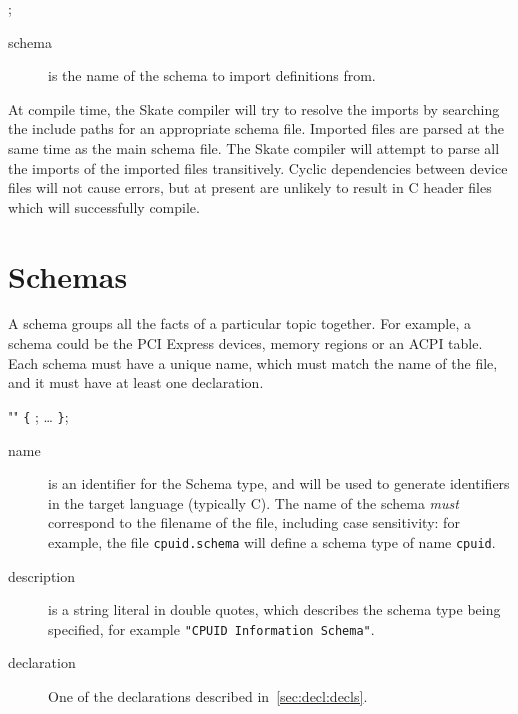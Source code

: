 \documentclass[a4paper,11pt,twoside]{report}
\begin{document}
{{\begin{syntax}
 ;
\end{syntax}

\begin{description}
\item[schema] is the name of the schema to import definitions from.  
\end{description}

At compile time, the Skate compiler will try to resolve the imports by 
searching the include paths for an appropriate schema file. Imported files
are parsed at the same time as the main schema file. The Skate compiler will
attempt to parse all the imports of the imported files transitively. 
Cyclic dependencies between device files will not cause errors, but at present 
are unlikely to result in C header files which will successfully compile. 

\section{Schemas}\label{sec:decl:schema}

A schema groups all the facts of a particular topic together. For example, 
a schema could be the PCI Express devices, memory regions or an ACPI table. 
Each schema must have a unique name, which must match the name of the file, and
it must have at least one declaration.

\begin{syntax}
  "" \verb+{+
  ;
  \ldots
\verb+}+;
\end{syntax}

\begin{description}
\item[name] is an identifier for the Schema type, and will be used to
  generate identifiers in the target language (typically C).  
  The name of the schema \emph{must} correspond to the
  filename of the file, including case sensitivity: for example, 
  the file \texttt{cpuid.schema} will define a schema type
  of name \texttt{cpuid}. 

\item [description] is a string literal in double quotes, which
  describes the schema type being specified, for example \texttt{"CPUID 
  Information Schema"}. 

\item [declaration] One of the declarations described in~\ref{sec:decl:decls}.


\end{description}}}
\end{document}
